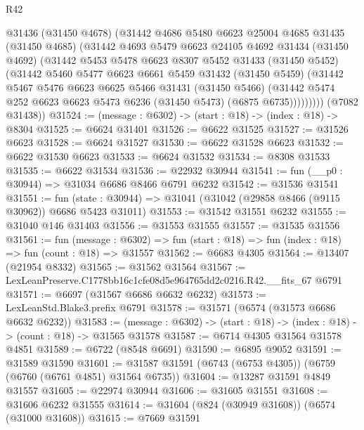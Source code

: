 \begin{lexlean}{R42}
\begin{coremodule}
{          @31436
          (@31450 @4678)
          (@31442
            @4686
            @5480
            @6623
            @25004
            @4685
            @31435
            (@31450 @4685)
            (@31442
              @4693
              @5479
              @6623
              @24105
              @4692
              @31434
              (@31450 @4692)
              (@31442
                @5453
                @5478
                @6623
                @8307
                @5452
                @31433
                (@31450 @5452)
                (@31442
                  @5460
                  @5477
                  @6623
                  @6661
                  @5459
                  @31432
                  (@31450 @5459)
                  (@31442
                    @5467
                    @5476
                    @6623
                    @6625
                    @5466
                    @31431
                    (@31450 @5466)
                    (@31442 @5474 @252 @6623 @6623 @5473 @6236 (@31450 @5473) (@6875 @6735)))))))))
      (@7082 @31438))
@31524 := (message : @6302) -> (start : @18) -> (index : @18) -> @8304
@31525 := @6624 @31401
@31526 := @6622 @31525
@31527 := @31526 @6623
@31528 := @6624 @31527
@31530 := @6622 @31528 @6623
@31532 := @6622 @31530 @6623
@31533 := @6624 @31532
@31534 := @8308 @31533
@31535 := @6622 @31534
@31536 := @22932 @30944
@31541 := fun (__p0 : @30944) => @31034 @6686 @8466 @6791 @6232
@31542 := @31536 @31541
@31551 := fun (state : @30944) => @31041 (@31042 (@29858 @8466 (@9115 @30962)) @6686 @5423 @31011)
@31553 := @31542 @31551 @6232
@31555 := @31040 @146 @31403
@31556 := @31553 @31555
@31557 := @31535 @31556
@31561 := fun (message : @6302) =>
  fun (start : @18) => fun (index : @18) => fun (count : @18) => @31557
@31562 := @6683 @4305
@31564 := @13407 (@21954 @8332)
@31565 := @31562 @31564
@31567 := LexLeanPreserve.C1778bb16c1cfe08d5e964765dd2c0216.R42.__fits_67 @6791
@31571 := @6697 (@31567 @6686 @6632 @6232)
@31573 := LexLeanStd.Blake3.prefix @6791
@31578 := @31571 (@6574 (@31573 @6686 @6632 @6232))
@31583 := (message : @6302) -> (start : @18) -> (index : @18) -> (count : @18) -> @31565 @31578
@31587 := @6714 @4305 @31564 @31578 @4851
@31589 := @6722 (@8548 @6691)
@31590 := @6895 @9052
@31591 := @31589 @31590
@31601 := @31587 @31591 (@6743 (@6753 @4305)) (@6759 (@6760 (@6761 @4851) @31564 @6735))
@31604 := @13287 @31591 @4849 @31557
@31605 := @22974 @30944
@31606 := @31605 @31551
@31608 := @31606 @6232 @31555
@31614 := @31604 (@824 (@30949 @31608)) (@6574 (@31000 @31608))
@31615 := @7669 @31591
}
\end{coremodule}
\end{lexlean}

